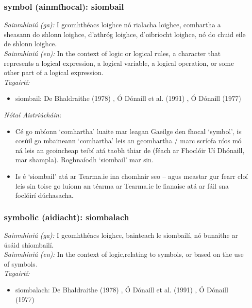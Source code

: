 \subsubsection*{symbol (ainmfhocal): siombail}
 \noindent \textit{Sainmhíniú (ga):} I gcomhthéacs loighce nó rialacha loighce, comhartha a sheasann do shlonn loighce, d'athróg loighce, d'oibríocht loighce, nó do chuid eile de shlonn loighce.
\\
 \noindent \textit{Sainmhíniú (en):} In the context of logic or logical rules, a character that represents a logical expression, a logical variable, a logical operation, or some other part of a logical expression.
\\
 \noindent \textit{Tagairtí:}
\begin{itemize}
	\item siombail: De Bhaldraithe (1978) \cite{de-bhaldraithe}, Ó Dónaill et al. (1991) \cite{focloir-beag}, Ó Dónaill (1977) \cite{odonaill}
\end{itemize}

 \noindent \textit{Nótaí Aistriúcháin:}
\begin{itemize}
	\item Cé go mbíonn `comhartha' luaite mar leagan Gaeilge den fhocal `symbol', is cosúil go mbaineann `comhartha' leis an gcomhartha / marc scríofa níos mó ná leis an gcoincheap teibí atá taobh thiar de (féach ar Fhoclóir Uí Dhónaill, mar shampla). Roghnaíodh `siombail' mar sin.
	\item Is é `siombail' atá ar Tearma.ie ina chomhair seo -- agus meastar gur fearr cloí leis sin toisc go luíonn an téarma ar Tearma.ie le fianaise atá ar fáil sna foclóirí dúchasacha.
\end{itemize}


\subsubsection*{symbolic (aidiacht): siombalach}
 \noindent \textit{Sainmhíniú (ga):} I gcomhthéacs loighce, bainteach le siombailí, nó bunaithe ar úsáid shiombailí.
\\
 \noindent \textit{Sainmhíniú (en):} In the context of logic,relating to symbols, or based on the use of symbols.
\\
 \noindent \textit{Tagairtí:}
\begin{itemize}
	\item siombalach: De Bhaldraithe (1978) \cite{de-bhaldraithe}, Ó Dónaill et al. (1991) \cite{focloir-beag}, Ó Dónaill (1977) \cite{odonaill}
\end{itemize}

